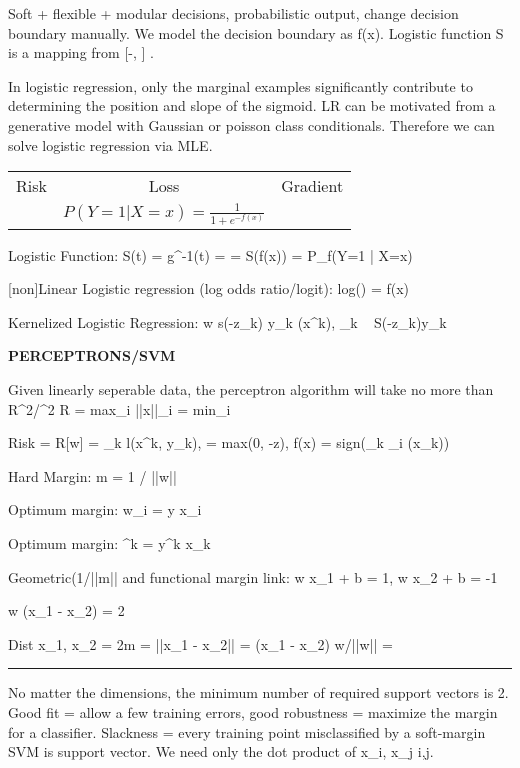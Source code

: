 \documentclass[a4paper,twoside,twocolumn]{article}
\begin{document}
\setlength{\parindent}{0pt}
{\scriptsize
Soft + flexible + modular decisions, probabilistic output, change decision boundary manually.  We model the decision boundary as f(x). Logistic function S is a mapping from [-\inf, \inf] \rightarrow [0, 1].

In logistic regression, only the marginal examples significantly contribute to determining the position and slope of the sigmoid. LR can be motivated from a generative model with Gaussian or poisson class conditionals. Therefore we can solve logistic regression via MLE.

\begin{tabular}{ c c c}
Risk & Loss & Gradient \\
& $P(Y = 1 | X = x) = \frac{1}{1 + e^{-f(x)}}$ &
\end{tabular}

Logistic Function: S(t) = g^{-1}(t) =  = S(f(x)) = P_f(Y=1 | X=x)

[non]Linear Logistic regression (log odds ratio/logit): log() = f(x)

Kernelized Logistic Regression: \Delta w \approx s(-z_k) y_k \phi(x^k), \Delta \alpha_k ~ S(-z_k)y_k

}

\textbf{PERCEPTRONS/SVM}

\setlength{\parindent}{0pt}
{\scriptsize
Given linearly seperable data, the perceptron algorithm will take no more than R^2/\gamma^2  R = max_i ||x||_i  \gamma = min_i 

Risk = R[w] = \sum_k l(x^k, y_k),  = max(0, -z), f(x) = sign(\Sigma_k \alpha_i \phi(x_k))

Hard Margin: m = 1 / ||w||

Optimum margin: \Delta w_i = \eta y x_i 

Optimum margin: \Delta \alpha^k = \eta y^k x_k 

Geometric(1/||m|| and functional margin link: w \cdot x_1 + b = 1, w \cdot x_2 + b = -1

w (x_1 - x_2) = 2

Dist x_1, x_2 = 2m = ||x_1 - x_2|| = (x_1 - x_2) \cdot w/||w|| = }

\noindent\rule{8cm}{0.4pt}

No matter the dimensions, the minimum number of required support vectors is 2. Good fit = allow a few training errors, good robustness = maximize the margin for a classifier. Slackness = every training point misclassified by a soft-margin SVM is support vector. We need only the dot product of x_i, x_j \forall i,j.
\end{document}
